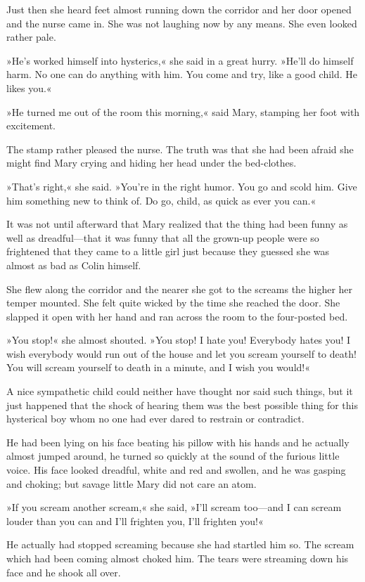Just then she heard feet almost running down the corridor and her door opened and the nurse came in. She was not laughing now by any means. She even looked rather pale.

»He's worked himself into hysterics,« she said in a great hurry. »He'll do himself harm. No one can do anything with him. You come and try, like a good child. He likes you.«

»He turned me out of the room this morning,« said Mary, stamping her foot with excitement.

The stamp rather pleased the nurse. The truth was that she had been afraid she might find Mary crying and hiding her head under the bed-clothes.

»That's right,« she said. »You're in the right humor. You go and scold him. Give him something new to think of. Do go, child, as quick as ever you can.«

It was not until afterward that Mary realized that the thing had been funny as well as dreadful—that it was funny that all the grown-up people were so frightened that they came to a little girl just because they guessed she was almost as bad as Colin himself.

She flew along the corridor and the nearer she got to the screams the higher her temper mounted. She felt quite wicked by the time she reached the door. She slapped it open with her hand and ran across the room to the four-posted bed.

»You stop!« she almost shouted. »You stop! I hate you! Everybody hates you! I wish everybody would run out of the house and let you scream yourself to death! You will scream yourself to death in a minute, and I wish you would!«

A nice sympathetic child could neither have thought nor said such things, but it just happened that the shock of hearing them was the best possible thing for this hysterical boy whom no one had ever dared to restrain or contradict.

He had been lying on his face beating his pillow with his hands and he actually almost jumped around, he turned so quickly at the sound of the furious little voice. His face looked dreadful, white and red and swollen, and he was gasping and choking; but savage little Mary did not care an atom.

»If you scream another scream,« she said, »I'll scream too—and I can scream louder than you can and I'll frighten you, I'll frighten you!«

He actually had stopped screaming because she had startled him so. The scream which had been coming almost choked him. The tears were streaming down his face and he shook all over.


